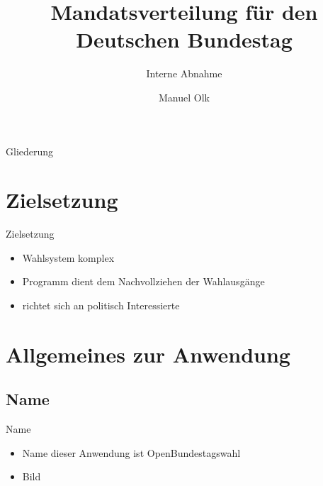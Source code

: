 \documentclass[18pt]{beamer}
\title[Interne Abnahme]{Mandatsverteilung für den Deutschen Bundestag}
\subtitle{Interne Abnahme}
\author{Manuel Olk}
\institute{Praxis der Softwareentwicklung, WS 2013/14}
\begin{document}

\begin{frame}
\titlepage
\end{frame}

\begin{frame}{Gliederung}
\tableofcontents
\end{frame}


\section{Zielsetzung}
\begin{frame}{Zielsetzung}
\begin{itemize}
	\item Wahlsystem komplex
	\item Programm dient dem Nachvollziehen der Wahlausgänge
	\item richtet sich an politisch Interessierte
\end{itemize}
\end{frame}

\section{Allgemeines zur Anwendung}
\subsection{Name}
\begin{frame}{Name}
\begin{itemize}
	\item Name dieser Anwendung ist OpenBundestagswahl
	\item Bild
\end{itemize}
\end{frame}
\end{document}
